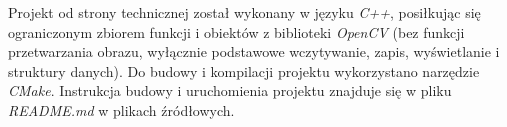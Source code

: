 Projekt od strony technicznej został wykonany w języku \emph{C++}, posiłkując się ograniczonym zbiorem funkcji i obiektów z biblioteki \emph{OpenCV} (bez funkcji przetwarzania obrazu, wyłącznie podstawowe wczytywanie, zapis, wyświetlanie i struktury danych). Do budowy i kompilacji projektu wykorzystano narzędzie \emph{CMake}.
Instrukcja budowy i uruchomienia projektu znajduje się w pliku \emph{README.md} w plikach źródłowych.